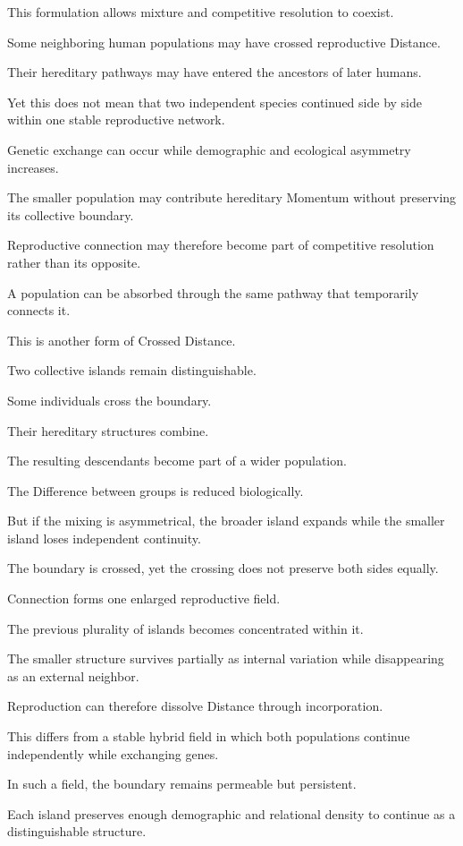 This formulation allows mixture and competitive resolution to coexist.

Some neighboring human populations may have crossed reproductive Distance.

Their hereditary pathways may have entered the ancestors of later humans.

Yet this does not mean that two independent species continued side by side within one stable reproductive network.

Genetic exchange can occur while demographic and ecological asymmetry increases.

The smaller population may contribute hereditary Momentum without preserving its collective boundary.

Reproductive connection may therefore become part of competitive resolution rather than its opposite.

A population can be absorbed through the same pathway that temporarily connects it.

This is another form of Crossed Distance.

Two collective islands remain distinguishable.

Some individuals cross the boundary.

Their hereditary structures combine.

The resulting descendants become part of a wider population.

The Difference between groups is reduced biologically.

But if the mixing is asymmetrical, the broader island expands while the smaller island loses independent continuity.

The boundary is crossed, yet the crossing does not preserve both sides equally.

Connection forms one enlarged reproductive field.

The previous plurality of islands becomes concentrated within it.

The smaller structure survives partially as internal variation while disappearing as an external neighbor.

Reproduction can therefore dissolve Distance through incorporation.

This differs from a stable hybrid field in which both populations continue independently while exchanging genes.

In such a field, the boundary remains permeable but persistent.

Each island preserves enough demographic and relational density to continue as a distinguishable structure.


